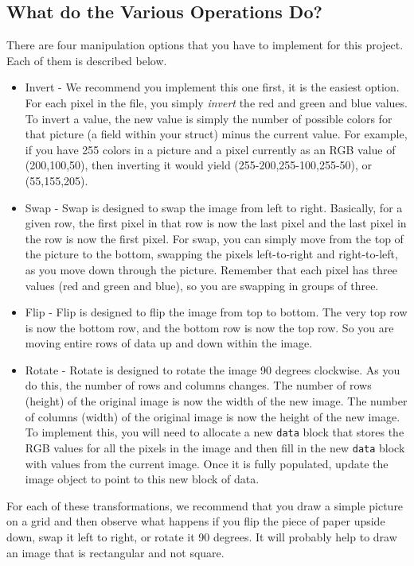 \documentclass[12pt]{article}
\begin{document}
\subsection*{What do the Various Operations Do?}

There are four manipulation options that you have to implement for this project.  Each
of them is described below.

\begin{itemize}
\item Invert - We recommend you implement this one first, it is the easiest
option.  For each pixel in the file, you simply {\it invert} the red and green
and blue values.  To invert a value, the new value is simply the number of
possible colors for that picture (a field within your struct) minus the current
value.  For example, if you have 255 colors in a picture and a pixel currently
as an RGB value of (200,100,50), then inverting it would yield
(255-200,255-100,255-50), or (55,155,205).
\item Swap - Swap is designed to swap the image from left to right.  Basically,
for a given row, the first pixel in that row is now the last pixel and the last
pixel in the row is now the first pixel.  For swap, you can simply move
from the top of the picture to the bottom, swapping the pixels left-to-right
and right-to-left, as you move down through the picture.  Remember that each
pixel has three values (red and green and blue), so you are swapping in
groups of three.
\item Flip - Flip is designed to flip the image from top to bottom.  The very
top row is now the bottom row, and the bottom row is now the top row.  So you
are moving entire rows of data up and down within the image.
\item Rotate - Rotate is designed to rotate the image 90 degrees clockwise.
As you do this, the number of rows and columns changes.  The number of rows
(height) of the original image is now the width of the new image.  The
number of columns (width) of the original image is now the height of the 
new image.  To implement this, you will need to allocate a new {\tt data}
block that stores the RGB values for all the pixels in the image and then
fill in the new {\tt data} block with values from the current image.  Once it is
fully populated, update the image object to point to this new block of data.
\end{itemize}

For each of these transformations, we recommend that you draw a simple picture
on a grid and then observe what happens if you flip the piece of paper upside
down, swap it left to right, or rotate it 90 degrees.  It will probably
help to draw an image that is rectangular and not square.
\end{document}
